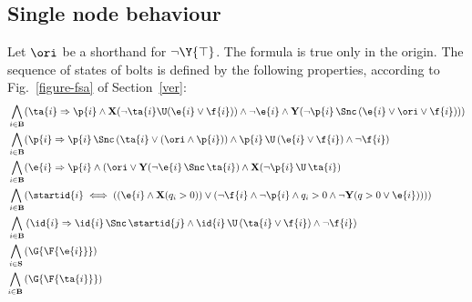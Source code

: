 
\subsection*{Single node behaviour}
Let $\ori$ be a shorthand for $\neg\Y{\top}$.
The formula is true only in the origin.
The sequence of states of bolts is defined by the following properties, according to Fig.~\ref{figure-fsa} of Section~\ref{ver}:
\begin{align*}
 \bigwedge_{
i \in \mathbf{B} } 
&(\ta{i} \Rightarrow 
\p{i} \wedge \mathbf{X}(\lnot \ta{i} \U (\e{i} \lor \f{i})) \land \lnot \e{i}
\land \mathbf{Y}(\lnot \p{i} \, \Snc \, (\e{i}\lor \ori \lor \f{i}))
) \\
%
 \bigwedge_{
i \in \mathbf{B} } 
&(\p{i} \Rightarrow 
\p{i} \, \Snc \, ( \ta{i} \lor (\ori \land \p{i})) \land \p{i} \, \U \, (\e{i} \lor \f{i}) \land \lnot \f{i}) \\
%
 \bigwedge_{
i \in \mathbf{B} } 
&(\e{i} \Rightarrow \p{i} 
\wedge (\ori \lor \mathbf{Y}(\lnot \e{i} \, \Snc \, \ta{i})
\land \mathbf{X}(\lnot \p{i} \, \U \, \ta{i}) \\
%
\bigwedge_{
	\begin{subarray}{c}
	\,i \in \mathbf{B}
	\end{subarray}
}
&(\startid{i} \iff ( (\e{i} \land \mathbf{X}(q_i>0)) \lor (\lnot \f{i} \land \lnot \p{i} \land q_i>0 \land \lnot \mathbf{Y}(q>0 \lor \e{i}) ) ))\\
%
%
\bigwedge_{
	i \in \mathbf{B} } 
&\left( 
\id{i} \Rightarrow 
\id{i} \, \Snc \, \startid{j} \land 
\id{i} \, \U \, (\ta{i} \lor \f{i}) \land \lnot \f{i}
\right)  \\
%
%
\bigwedge_{
i \in \mathbf{S}} \,
&(\G{\F{\e{i}}}) \\
%
%
 \bigwedge_{
\begin{subarray}{c}
i \in \mathbf{B}
\end{subarray}} \,
&(\G{\F{\ta{i}}}) 
%
\end{align*}  




